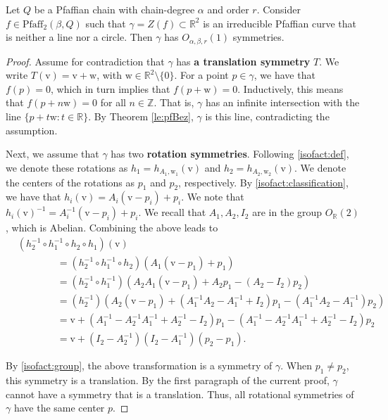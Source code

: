 \documentclass[10pt,a4paper]{amsart}
\newcommand*{\vecv}{\mathrm{v}}
\newcommand*{\vecw}{\mathrm{w}}
\newcommand{\Pf}{\mathrm{Pfaff}}
\newcommand{\RR}{\mathbb R}
\newcommand{\ZZ}{\mathbb Z}
\begin{document}
\begin{lemma}\label{lem:syms}
Let $Q$ be a Pfaffian chain with chain-degree $\alpha$ and order $r$. 
Consider $f \in \Pf_2(\beta, Q)$ such that $\gamma= Z(f)\subset \RR^2$ is an irreducible Pfaffian curve that is neither a line nor a circle. Then $\gamma$ has $O_{\alpha,\beta,r}(1)$ symmetries.
\end{lemma}

\begin{proof}
Assume for contradiction that $\gamma$ has {\bf a translation symmetry} $T$.
We write $T(\vecv) = \vecv+\vecw$, with $\vecw\in \RR^2\setminus \{0\}$. 
For a point $p\in \gamma$, we have that $f(p) = 0$, which in turn implies that $f(p+\vecw)=0$. 
Inductively, this means that $f(p + n\vecw) = 0$ for all $n \in \ZZ$. 
That is, $\gamma$ has an infinite intersection with the line $\{p + t\vecw : t\in \RR \}$.
By Theorem \ref{le:pfBez}, $\gamma$ is this line, contradicting the assumption.  
  
Next, we assume that $\gamma$ has two {\bf rotation symmetries}.
Following \ref{isofact:def}, we denote these rotations as $h_1=h_{A_1, \vecw_1}(\vecv)$ and $h_2=h_{A_2, \vecw_2}(\vecv)$.
We denote the centers of the rotations as $p_1$ and $p_2$, respectively.
By \ref{isofact:classification}, we have that $h_{i}(\vecv) = A_i(\vecv-p_i) + p_i$. 
We note that $h_{i}(\vecv)^{-1} = A_i^{-1}(\vecv-p_i) + p_i$.
We recall that $A_1,A_2,I_2$ are in the group $O_\RR(2)$, which is Abelian. 
Combining the above leads to
  \begin{align*}
 &(h_2^{-1} \circ h_1^{-1} \circ h_2 \circ h_1)(\vecv) \nonumber \\
 &\qquad \qquad = (h_2^{-1} \circ h_1^{-1} \circ h_2)(A_1(\vecv - p_1) + p_1) \nonumber \\
 &\qquad \qquad = (h_2^{-1} \circ h_1^{-1})(A_2A_1(\vecv - p_1) + A_2 p_1 - (A_2 - I_2)p_2) \nonumber \\
 &\qquad \qquad = (h_2^{-1})(A_2(\vecv - p_1) + (A_1^{-1}A_2 - A_1^{-1} + I_2)p_1 - (A_1^{-1}A_2 - A_1^{-1})p_2) \nonumber \\
 &\qquad \qquad = \vecv + (A_1^{-1} - A_2^{-1}A_1^{-1} + A_2^{-1} - I_2) p_1 - (A_1^{-1} - A_2^{-1}A_1^{-1} + A_2^{-1} - I_2) p_2 \nonumber \\
 &\qquad \qquad = \vecv + (I_2 - A_2^{-1})(I_2 - A_1^{-1})(p_2 -p_1). \nonumber
 \end{align*}

By \ref{isofact:group}, the above transformation is a symmetry of $\gamma$.
When $p_1\neq p_2$, this symmetry is a translation. 
By the first paragraph of the current proof, $\gamma$ cannot have a symmetry that is a translation.
Thus, all rotational symmetries of $\gamma$ have the same center $p$.


\end{proof}
\end{document}
